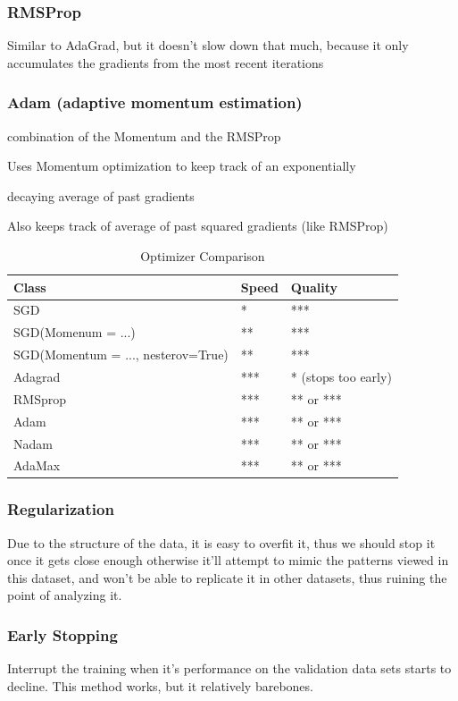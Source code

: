 \documentclass[article]{llncs}
\begin{document}
\subsubsection{RMSProp}
Similar to AdaGrad, but it doesn't slow down that much, because it only accumulates the gradients from the most recent iterations

\subsubsection{Adam (adaptive momentum estimation)}
combination of the Momentum and the RMSProp

Uses Momentum optimization to keep track of an exponentially

decaying average of past gradients

Also keeps track of average of past squared gradients (like RMSProp)

\begin{table}[H]
\caption{Optimizer Comparison}\label{tab1}
\begin{tabular}{|l|l|l|}
\hline
Class & Speed & Quality \\
\hline
SGD &  * & ***\\
\hline
SGD(Momenum = ...) &  ** & *** \\
\hline
SGD(Momentum = ..., nesterov=True) & ** & ***\\
\hline
Adagrad &  *** & * (stops too early)\\
\hline
RMSprop &  *** & ** or ***\\
\hline
Adam &  *** & ** or ***\\
\hline
Nadam &  *** & ** or ***\\
\hline
AdaMax &  *** & ** or ***\\
\hline
\end{tabular}
\end{table}

\subsubsection{Regularization}
Due to the structure of the data, it is easy to overfit it, thus we should stop it once it gets close enough otherwise it'll attempt to mimic the patterns viewed in this dataset, and won't be able to replicate it in other datasets, thus ruining the point of analyzing it.

\subsubsection{Early Stopping}
Interrupt the training when it's performance on the validation data sets starts to decline. This method works, but it relatively barebones.
\end{document}
